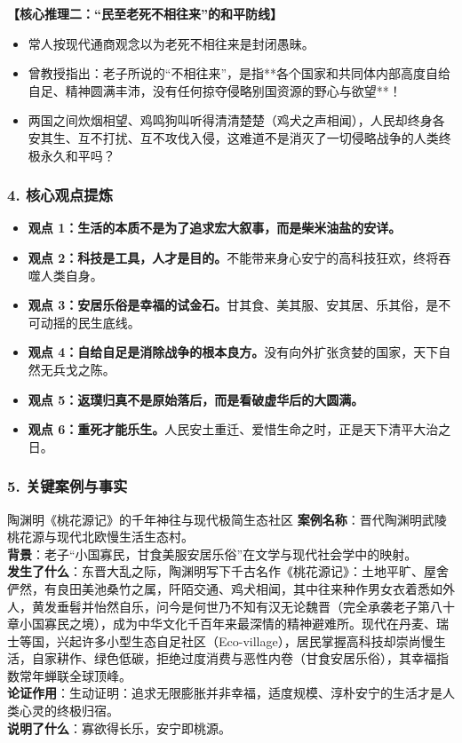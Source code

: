 \noindent\textbf{【核心推理二：“民至老死不相往来”的和平防线】}
\begin{itemize}
    \item 常人按现代通商观念以为老死不相往来是封闭愚昧。
    \item 曾教授指出：老子所说的“不相往来”，是指**各个国家和共同体内部高度自给自足、精神圆满丰沛，没有任何掠夺侵略别国资源的野心与欲望**！
    \item 两国之间炊烟相望、鸡鸣狗叫听得清清楚楚（鸡犬之声相闻），人民却终身各安其生、互不打扰、互不攻伐入侵，这难道不是消灭了一切侵略战争的人类终极永久和平吗？
\end{itemize}

\subsubsection{4. 核心观点提炼}
\begin{itemize}
    \item \textbf{观点 1：生活的本质不是为了追求宏大叙事，而是柴米油盐的安详。}
    \item \textbf{观点 2：科技是工具，人才是目的。}不能带来身心安宁的高科技狂欢，终将吞噬人类自身。
    \item \textbf{观点 3：安居乐俗是幸福的试金石。}甘其食、美其服、安其居、乐其俗，是不可动摇的民生底线。
    \item \textbf{观点 4：自给自足是消除战争的根本良方。}没有向外扩张贪婪的国家，天下自然无兵戈之陈。
    \item \textbf{观点 5：返璞归真不是原始落后，而是看破虚华后的大圆满。}
    \item \textbf{观点 6：重死才能乐生。}人民安土重迁、爱惜生命之时，正是天下清平大治之日。
\end{itemize}

\subsubsection{5. 关键案例与事实}
\begin{CaseBox}{陶渊明《桃花源记》的千年神往与现代极简生态社区}
\textbf{案例名称}：晋代陶渊明武陵桃花源与现代北欧慢生活生态村。\\
\textbf{背景}：老子“小国寡民，甘食美服安居乐俗”在文学与现代社会学中的映射。\\
\textbf{发生了什么}：东晋大乱之际，陶渊明写下千古名作《桃花源记》：土地平旷、屋舍俨然，有良田美池桑竹之属，阡陌交通、鸡犬相闻，其中往来种作男女衣着悉如外人，黄发垂髫并怡然自乐，问今是何世乃不知有汉无论魏晋（完全承袭老子第八十章小国寡民之境），成为中华文化千百年来最深情的精神避难所。现代在丹麦、瑞士等国，兴起许多小型生态自足社区（Eco-village），居民掌握高科技却崇尚慢生活，自家耕作、绿色低碳，拒绝过度消费与恶性内卷（甘食安居乐俗），其幸福指数常年蝉联全球顶峰。\\
\textbf{论证作用}：生动证明：追求无限膨胀并非幸福，适度规模、淳朴安宁的生活才是人类心灵的终极归宿。\\
\textbf{说明了什么}：寡欲得长乐，安宁即桃源。
\end{CaseBox}

